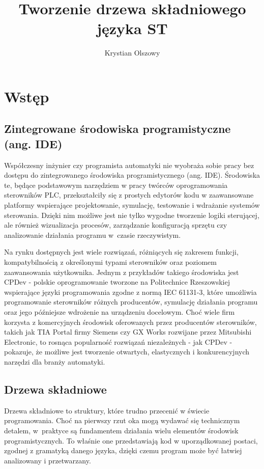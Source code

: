 \documentclass[12pt,twoside]{article}
\author{Krystian Olszowy}
\title{Tworzenie drzewa składniowego języka ST}
\begin{document}
\maketitle

\blankpage

\tableofcontents

\clearpage
\blankpage

\section{Wstęp}
\subsection{Zintegrowane środowiska programistyczne (ang. IDE)}
Współczesny inżynier czy programista automatyki nie wyobraża sobie pracy bez dostępu do zintegrowanego środowiska programistycznego (ang. IDE). Środowiska te, będące podstawowym narzędziem w pracy twórców oprogramowania sterowników PLC, przekształciły się z prostych edytorów kodu w zaawansowane platformy wspierające projektowanie, symulację, testowanie i wdrażanie systemów sterowania. Dzięki nim możliwe jest nie tylko wygodne tworzenie logiki sterującej, ale również wizualizacja procesów, zarządzanie konfiguracją sprzętu czy analizowanie działania programu w~czasie rzeczywistym.

Na rynku dostępnych jest wiele rozwiązań, różniących się zakresem funkcji, kompatybilnością z określonymi typami sterowników oraz poziomem zaawansowania użytkownika. Jednym z przykładów takiego środowiska jest CPDev - polskie oprogramowanie tworzone na Politechnice Rzeszowskiej wspierające języki programowania zgodne z normą IEC 61131-3, które umożliwia programowanie sterowników różnych producentów, symulację działania programu oraz jego późniejsze wdrożenie na urządzeniu docelowym. Choć wiele firm korzysta z komercyjnych środowisk oferowanych przez producentów sterowników, takich jak TIA Portal firmy Siemens czy GX Works rozwijane przez Mitsubishi Electronic, to rosnąca popularność rozwiązań niezależnych - jak CPDev - pokazuje, że możliwe jest tworzenie otwartych, elastycznych i konkurencyjnych narzędzi dla branży automatyki.

\subsection{Drzewa składniowe}
Drzewa składniowe to struktury, które trudno przecenić w świecie programowania. Choć na pierwszy rzut oka mogą wydawać się technicznym detalem, w~praktyce są fundamentem działania wielu elementów środowisk programistycznych. To właśnie one przedstawiają kod w uporządkowanej postaci, zgodnej z gramatyką danego języka, dzięki czemu program może być łatwiej analizowany i przetwarzany.
\end{document}

